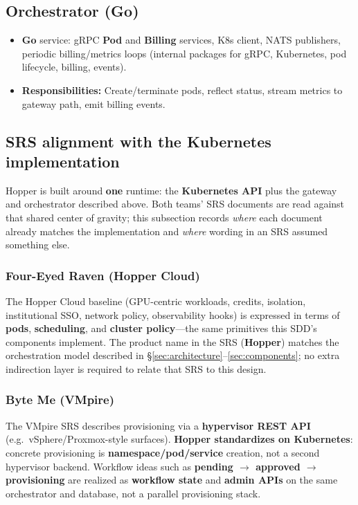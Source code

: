 \documentclass[12pt,a4paper]{article}
\newcommand{\ByteMeHeading}{Byte Me}
\newcommand{\ByteMe}{%
  \texorpdfstring{\textbf{\ByteMeHeading}}{Byte Me}%
}
\begin{document}
\subsection{Orchestrator (Go)}
\begin{itemize}[leftmargin=*]
  \item \textbf{Go} service: gRPC \textbf{Pod} and \textbf{Billing} services, K8s client, NATS publishers, periodic billing/metrics loops (internal packages for gRPC, Kubernetes, pod lifecycle, billing, events).
  \item \textbf{Responsibilities:} Create/terminate pods, reflect status, stream metrics to gateway path, emit billing events.
\end{itemize}

\subsection{SRS alignment with the Kubernetes implementation}
\label{sec:srs-k8s-alignment}
Hopper is built around \textbf{one} runtime: the \textbf{Kubernetes API} plus the gateway and orchestrator described above. Both teams' SRS documents are read against that shared center of gravity; this subsection records \emph{where} each document already matches the implementation and \emph{where} wording in an SRS assumed something else.

\subsubsection*{Four-Eyed Raven (Hopper Cloud)}
The Hopper Cloud baseline (GPU-centric workloads, credits, isolation, institutional SSO, network policy, observability hooks) is expressed in terms of \textbf{pods}, \textbf{scheduling}, and \textbf{cluster policy}---the same primitives this SDD's components implement. The product name in the SRS (\textbf{Hopper}) matches the orchestration model described in \S\ref{sec:architecture}--\ref{sec:components}; no extra indirection layer is required to relate that SRS to this design.

\subsubsection*{\ByteMe{} (VMpire)}
The VMpire SRS describes provisioning via a \textbf{hypervisor REST API} (e.g.\ vSphere/Proxmox-style surfaces). \textbf{Hopper standardizes on Kubernetes}: concrete provisioning is \textbf{namespace/pod/service} creation, not a second hypervisor backend. Workflow ideas such as \textbf{pending $\rightarrow$ approved $\rightarrow$ provisioning} are realized as \textbf{workflow state} and \textbf{admin APIs} on the same orchestrator and database, not a parallel provisioning stack.
\end{document}
